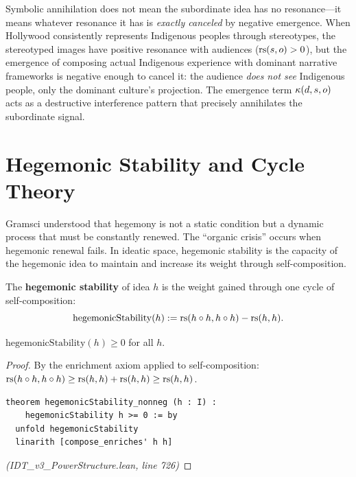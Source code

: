 \begin{interpretation}
Symbolic annihilation does not mean the subordinate idea has no resonance---it
means whatever resonance it has is \emph{exactly canceled} by negative emergence.
When Hollywood consistently represents Indigenous peoples through stereotypes,
the stereotyped images have positive resonance with audiences ($\mathrm{rs}(s,o) > 0$),
but the emergence of composing actual Indigenous experience with dominant
narrative frameworks is negative enough to cancel it: the audience
\emph{does not see} Indigenous people, only the dominant culture's projection.
The emergence term $\kappa(d,s,o)$ acts as a destructive interference pattern
that precisely annihilates the subordinate signal.
\end{interpretation}

\section{Hegemonic Stability and Cycle Theory}

Gramsci understood that hegemony is not a static condition but a dynamic process
that must be constantly renewed. The ``organic crisis'' occurs when hegemonic
renewal fails. In ideatic space, hegemonic stability is the capacity of the
hegemonic idea to maintain and increase its weight through self-composition.

\begin{definition}
\label{def:hegemonic-stability}
The \textbf{hegemonic stability} of idea $h$ is the weight gained through
one cycle of self-composition:
\[
  \mathrm{hegemonicStability}(h) := \mathrm{rs}(h \circ h, h \circ h) - \mathrm{rs}(h, h).
\]
\end{definition}

\begin{theorem}
\label{thm:hegemonic-stability-nonneg}
$\mathrm{hegemonicStability}(h) \geq 0$ for all $h$.
\end{theorem}

\begin{proof}
By the enrichment axiom applied to self-composition:
$\mathrm{rs}(h \circ h, h \circ h) \geq \mathrm{rs}(h,h) + \mathrm{rs}(h,h) \geq \mathrm{rs}(h,h)$.
\begin{lstlisting}
theorem hegemonicStability_nonneg (h : I) :
    hegemonicStability h >= 0 := by
  unfold hegemonicStability
  linarith [compose_enriches' h h]
\end{lstlisting}
\textit{(IDT\_v3\_PowerStructure.lean, line 726)}
\end{proof}

